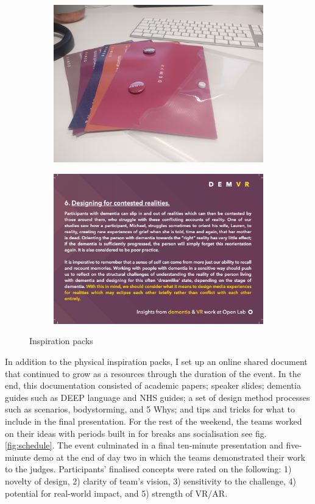 \begin{figure}
\centering
\begin{subfigure}{.5\textwidth}
  \centering
  \includegraphics[width=.8\linewidth]{Images/DemVR/DemVRInspiration.jpeg}
  \label{fig:InspirationPackImage}
\end{subfigure}%
\begin{subfigure}{.5\textwidth}
  \centering
  \includegraphics[width=.8\linewidth]{Images/DemVR/InspirationCard.png}
  \label{fig:InspirationCard}
\end{subfigure}
\caption{Inspiration packs}
\label{fig:InspirationPacks}
\end{figure}

In addition to the physical inspiration packs, I set up an online shared document that continued to grow as a resources through the duration of the event. In the end, this documentation consisted of academic papers; speaker slides; dementia guides such as DEEP language and NHS guides; a set of design method processes such as scenarios, bodystorming, and 5 Whys; and tips and tricks for what to include in the final presentation. For the rest of the weekend, the teams worked on their ideas with periods built in for breaks ans socialisation see fig.\ref{fig:schedule}. The event culminated in a final ten-minute presentation and five-minute demo at the end of day two in which the teams demonstrated their work to the judges. Participants' finalised concepts were rated on the following: 1) novelty of design, 2) clarity of team's vision, 3) sensitivity to the challenge, 4) potential for real-world impact, and 5) strength of VR/AR.

